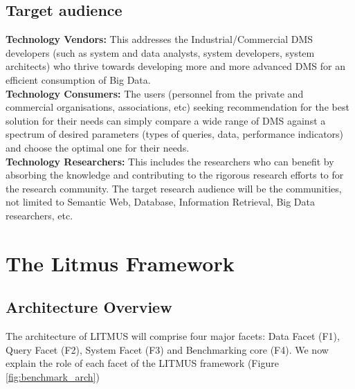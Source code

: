 \documentclass{llncs}
\begin{document}
    \subsection{Target audience}
            \textbf{Technology Vendors:}
            This addresses the Industrial/Commercial DMS developers (such as system and data analysts, system developers, system architects) who thrive towards developing more and more advanced DMS for an efficient consumption of Big Data.\\
            \textbf{Technology Consumers:}
            The users (personnel from the private and commercial organisations, associations, etc) seeking recommendation for the best solution for their needs can simply compare a wide range of DMS against a spectrum of desired parameters (types of queries, data, performance indicators) and choose the optimal one for their needs. \\
            \textbf{Technology Researchers:}
            This includes the researchers who can benefit by absorbing the knowledge and contributing to the rigorous research efforts to for the research community. The target research audience will be the communities, not limited to Semantic Web, Database, Information Retrieval, Big Data researchers, etc.

\section{The Litmus Framework}\label{litmus_framework}
      \subsection{Architecture Overview}
        The architecture of LITMUS will comprise four major facets: Data Facet (F1), Query Facet (F2), System Facet (F3) and Benchmarking core (F4). We now explain the role of each facet of the LITMUS framework (Figure \ref{fig:benchmark_arch})
         
\end{document}
